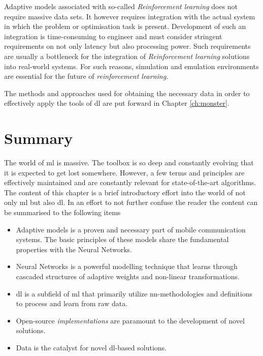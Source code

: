 Adaptive models associated with so-called \emph{Reinforcement learning} does not require massive data sets. It however requires integration with the actual system in which the problem or optimisation task is present. Development of such an integration is time-consuming to engineer and must consider stringent requirements on not only latency but also processing power. Such requirements are usually a bottleneck for the integration of \emph{Reinforcement learning} solutions into real-world systems. For such reasons, simulation and emulation environments are essential for the future of \emph{reinforcement learning}. 

The methods and approaches used for obtaining the necessary data in order to effectively apply the tools of \gls{dl} are put forward in Chapter \ref{ch:monster}. 

\section{Summary}
The world of \gls{ml} is massive. The toolbox is so deep and constantly evolving that it is expected to get lost somewhere. However, a few terms and principles are effectively maintained and are constantly relevant for state-of-the-art algorithms. The content of this chapter is a brief introductory effort into the world of not only \gls{ml} but also \gls{dl}. In an effort to not further confuse the reader the content can be summarised to the following items

\begin{itemize}
    \item Adaptive models is a proven and necessary part of mobile communication systems. The basic principles of these models share the fundamental properties with the Neural Networks. 
    \item Neural Networks is a powerful modelling technique that learns through cascaded structures of adaptive weights and non-linear transformations.
    \item \gls{dl} is a subfield of \gls{ml} that primarily utilize \gls{nn}-methodologies and definitions to process and learn from raw data.
    \item Open-source \emph{implementations} are paramount to the development of novel solutions.
    \item Data is the catalyst for novel \gls{dl}-based solutions.
\end{itemize}



 